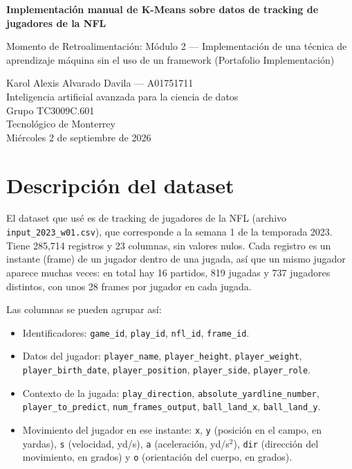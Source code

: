 \documentclass[11pt,a4paper]{article}
\begin{document}
\begin{center}
  {\LARGE\bfseries Implementación manual de K-Means sobre datos de tracking de jugadores de la NFL\par}
  \vspace{0.8em}
  {\large Momento de Retroalimentación: Módulo 2 --- Implementación de una técnica de aprendizaje máquina sin el uso de un framework (Portafolio Implementación)\par}
  \vspace{1.2em}
  Karol Alexis Alvarado Davila --- A01751711\\[0.3em]
  Inteligencia artificial avanzada para la ciencia de datos\\[0.3em]
  Grupo TC3009C.601\\[0.3em]
  Tecnológico de Monterrey\\[0.3em]
  Miércoles 2 de septiembre de 2026
\end{center}

\vspace{1em}

\section{Descripción del dataset}

El dataset que usé es de tracking de jugadores de la NFL (archivo \texttt{input\_2023\_w01.csv}), que corresponde a la semana 1 de la temporada 2023. Tiene 285{,}714 registros y 23 columnas, sin valores nulos. Cada registro es un instante (frame) de un jugador dentro de una jugada, así que un mismo jugador aparece muchas veces: en total hay 16 partidos, 819 jugadas y 737 jugadores distintos, con unos 28 frames por jugador en cada jugada.

Las columnas se pueden agrupar así:

\begin{itemize}
  \item Identificadores: \texttt{game\_id}, \texttt{play\_id}, \texttt{nfl\_id}, \texttt{frame\_id}.
  \item Datos del jugador: \texttt{player\_name}, \texttt{player\_height}, \texttt{player\_weight}, \texttt{player\_birth\_date}, \texttt{player\_position}, \texttt{player\_side}, \texttt{player\_role}.
  \item Contexto de la jugada: \texttt{play\_direction}, \texttt{absolute\_yardline\_number}, \texttt{player\_to\_predict}, \texttt{num\_frames\_output}, \texttt{ball\_land\_x}, \texttt{ball\_land\_y}.
  \item Movimiento del jugador en ese instante: \texttt{x}, \texttt{y} (posición en el campo, en yardas), \texttt{s} (velocidad, yd/s), \texttt{a} (aceleración, yd/s$^2$), \texttt{dir} (dirección del movimiento, en grados) y \texttt{o} (orientación del cuerpo, en grados).
\end{itemize}
\end{document}
